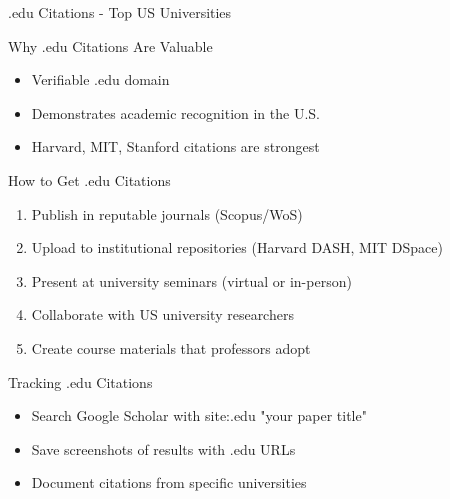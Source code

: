 \documentclass[11pt]{beamer}
\begin{document}
	\begin{frame}{.edu Citations - Top US Universities}
		\scriptsize
		\begin{block}{Why .edu Citations Are Valuable}
			\begin{itemize}
				\item Verifiable .edu domain
				\item Demonstrates academic recognition in the U.S.
				\item Harvard, MIT, Stanford citations are strongest
			\end{itemize}
		\end{block}
		\begin{block}{How to Get .edu Citations}
			\begin{enumerate}
				\item Publish in reputable journals (Scopus/WoS)
				\item Upload to institutional repositories (Harvard DASH, MIT DSpace)
				\item Present at university seminars (virtual or in-person)
				\item Collaborate with US university researchers
				\item Create course materials that professors adopt
			\end{enumerate}
		\end{block}
		\begin{block}{Tracking .edu Citations}
			\begin{itemize}
				\item Search Google Scholar with site:.edu "your paper title"
				\item Save screenshots of results with .edu URLs
				\item Document citations from specific universities
			\end{itemize}
		\end{block}
	\end{frame}
	
\end{document}
